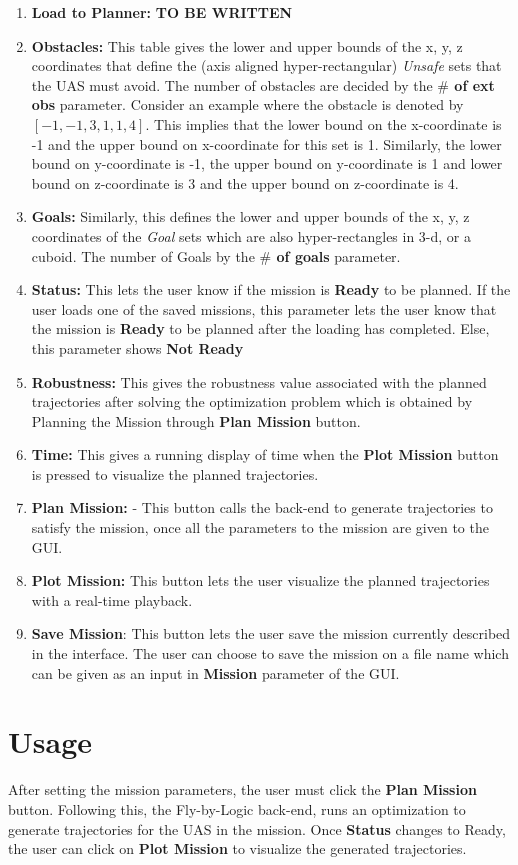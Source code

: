 \documentclass[english]{article}
\begin{document}
\begin{enumerate}
    \item \textbf{Load to Planner:}  \textbf{TO BE WRITTEN}
    \item \textbf{Obstacles:} This table gives the lower and upper bounds of the x, y, z coordinates that define the (axis aligned hyper-rectangular) \textit{Unsafe} sets that the UAS must avoid. The number of obstacles are decided by the \textbf{$\#$ of ext obs} parameter. Consider an example where the obstacle is denoted by $[-1,-1,3,1,1,4]$. This implies that the lower bound on the x-coordinate is -1 and the upper bound on x-coordinate for this set is 1. Similarly, the lower bound on y-coordinate is -1, the upper bound on y-coordinate is 1 and lower bound on z-coordinate is 3 and the upper bound on z-coordinate is 4.     
    \item \textbf{Goals:} Similarly, this defines the lower and upper bounds of the x, y, z coordinates of the \textit{Goal} sets which are also hyper-rectangles in 3-d, or a cuboid. The number of Goals by the \textbf{$\#$ of goals} parameter. 
    
    \item \textbf{Status:} This lets the user know if the mission is \textbf{Ready} to be planned. If the user loads one of the saved missions, this parameter lets the user know that the mission is \textbf{Ready} to be planned after the loading has completed. Else, this parameter shows \textbf{Not Ready}
    \item \textbf{Robustness:} This gives the robustness value associated with the planned trajectories after solving the optimization problem which is obtained by Planning the Mission through \textbf{Plan Mission} button. 
    \item \textbf{Time:} This gives a running display of time when the \textbf{Plot Mission} button is pressed to visualize the planned trajectories.
    \item \textbf{Plan Mission:} - This button calls the back-end to generate trajectories to satisfy the mission, once all the parameters to the mission are given to the GUI. 
    \item \textbf{Plot Mission:} This button lets the user visualize the planned trajectories with a real-time playback.
    \item \textbf{Save Mission}: This button lets the user save the mission currently described in the interface. The user can choose to save the mission on a file name which can be given as an input in \textbf{Mission} parameter of the GUI.
\end{enumerate}

\section{Usage}
%
After setting the mission parameters, the user must click the \textbf{Plan Mission} button. Following this, the Fly-by-Logic back-end, runs an optimization to generate trajectories for the UAS in the mission. Once \textbf{Status} changes to Ready, the user can click on \textbf{Plot Mission} to visualize the generated trajectories. 
\end{document}

